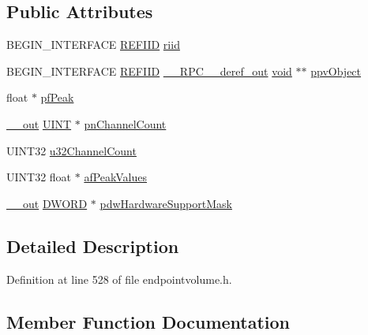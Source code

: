 \subsection*{Public Attributes}
\begin{DoxyCompactItemize}
\item 
B\+E\+G\+I\+N\+\_\+\+I\+N\+T\+E\+R\+F\+A\+CE \hyperlink{px__win__ds_8c_a80ec49c8ae61e234197d5071d2df497d}{R\+E\+F\+I\+ID} \hyperlink{struct_i_audio_meter_information_vtbl_a0a5da77096669d539d18a94855ff3bc1}{riid}
\item 
B\+E\+G\+I\+N\+\_\+\+I\+N\+T\+E\+R\+F\+A\+CE \hyperlink{px__win__ds_8c_a80ec49c8ae61e234197d5071d2df497d}{R\+E\+F\+I\+ID} \hyperlink{rpcsal_8h_a23bc188526f10656f9c79d950f6c3192}{\+\_\+\+\_\+\+R\+P\+C\+\_\+\+\_\+deref\+\_\+out} \hyperlink{sound_8c_ae35f5844602719cf66324f4de2a658b3}{void} $\ast$$\ast$ \hyperlink{struct_i_audio_meter_information_vtbl_a2c3648ad44fc0fd48fe088f68694b661}{ppv\+Object}
\item 
float $\ast$ \hyperlink{struct_i_audio_meter_information_vtbl_aead09c02703ec1653d18cd6c749f57e2}{pf\+Peak}
\item 
\hyperlink{sal_8h_abb4c3c1135aab6c47cff22e7c16efb74}{\+\_\+\+\_\+out} \hyperlink{mapinls_8h_a36cb3b01d81ffd844bbbfb54003e06ec}{U\+I\+NT} $\ast$ \hyperlink{struct_i_audio_meter_information_vtbl_a4d623a4a4046b0ed5d736fec9f5bdfdb}{pn\+Channel\+Count}
\item 
U\+I\+N\+T32 \hyperlink{struct_i_audio_meter_information_vtbl_a56cb77e40e88809fb9d42c5879807354}{u32\+Channel\+Count}
\item 
U\+I\+N\+T32 float $\ast$ \hyperlink{struct_i_audio_meter_information_vtbl_abdc52aa7adfc696c46057e9a6d2223ed}{af\+Peak\+Values}
\item 
\hyperlink{sal_8h_abb4c3c1135aab6c47cff22e7c16efb74}{\+\_\+\+\_\+out} \hyperlink{mapinls_8h_ad342ac907eb044443153a22f964bf0af}{D\+W\+O\+RD} $\ast$ \hyperlink{struct_i_audio_meter_information_vtbl_a872f52800e4baa961ccd83ec0c1c7688}{pdw\+Hardware\+Support\+Mask}
\end{DoxyCompactItemize}


\subsection{Detailed Description}


Definition at line 528 of file endpointvolume.\+h.



\subsection{Member Function Documentation}
